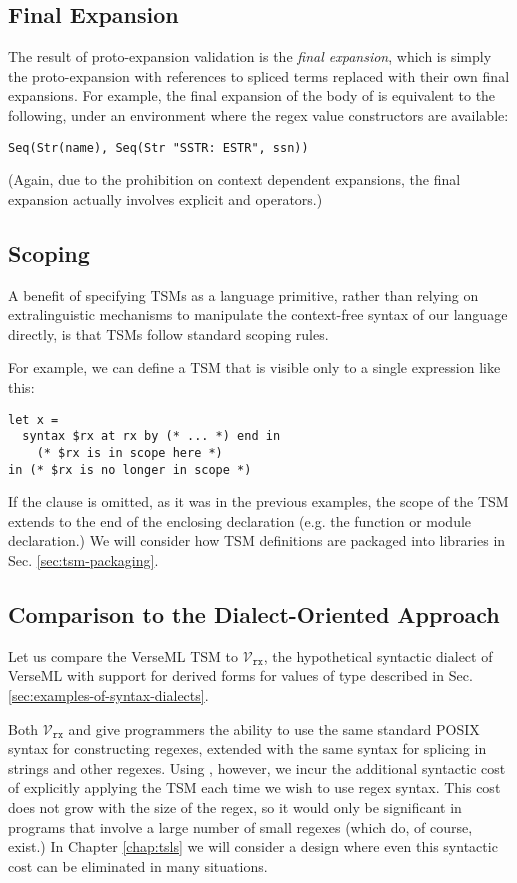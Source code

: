 \subsection{Final Expansion}
The result of proto-expansion validation is the \emph{final expansion}, which is simply the proto-expansion with  references to spliced terms replaced with their own final expansions. For example, the final expansion of the body of  is equivalent to the following, under an environment where the regex value constructors are available:
\begin{lstlisting}[numbers=none]
Seq(Str(name), Seq(Str "SSTR: ESTR", ssn))
\end{lstlisting}
(Again, due to the prohibition on context dependent expansions, the final expansion actually involves explicit  and  operators.)

\subsection{Scoping}
A benefit of specifying TSMs as a language primitive, rather than relying on extralinguistic mechanisms to manipulate the context-free syntax of our language directly, is that TSMs follow standard scoping rules.

For example, we can define a TSM that is visible only to a single expression like this:
\begin{lstlisting}[numbers=none]
let x = 
  syntax $rx at rx by (* ... *) end in 
    (* $rx is in scope here *) 
in (* $rx is no longer in scope *)
\end{lstlisting}

If the  clause is omitted, as it was in the previous examples, the scope of the TSM extends to the end of the enclosing declaration (e.g. the function or module declaration.)
We will consider how TSM definitions are packaged into libraries in Sec. \ref{sec:tsm-packaging}.

\subsection{Comparison to the Dialect-Oriented Approach}
Let us compare the VerseML TSM  to $\mathcal{V}_\texttt{rx}$, the hypothetical syntactic dialect of VerseML with support for derived forms for values of type  described in Sec. \ref{sec:examples-of-syntax-dialects}.

Both $\mathcal{V}_\texttt{rx}$ and  give programmers the ability to use the same standard POSIX syntax for constructing regexes, extended with the same syntax for splicing in strings and other regexes. Using , however, we incur the additional syntactic cost of explicitly applying the  TSM each time we wish to use regex syntax. This cost does not grow with the size of the regex, so it would only be significant in programs that involve a large number of small regexes (which do, of course, exist.) In Chapter \ref{chap:tsls} we will consider a design where even this syntactic cost can be eliminated in many situations.

